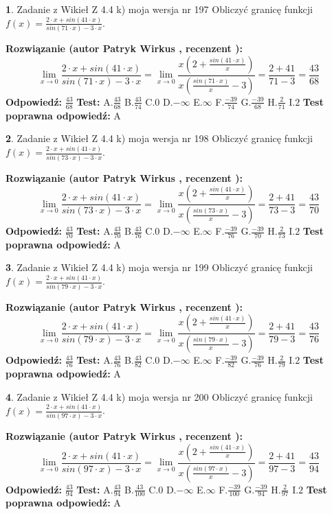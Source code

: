 \documentclass[12pt, a4paper]{article}
\theoremstyle{definition} %
\newtheorem{zad}{}
\newcommand{\zadStart}[1]{\begin{zad}#1\newline}
\newcommand{\zadStop}{\end{zad}}
\newcommand{\rozwStart}[2]{\noindent \textbf{Rozwiązanie (autor #1 , recenzent #2): }\newline}
\newcommand{\rozwStop}{\newline}
\newcommand{\odpStart}{\noindent \textbf{Odpowiedź:}\newline}
\newcommand{\odpStop}{\newline}
\newcommand{\testStart}{\noindent \textbf{Test:}\newline}
\newcommand{\testStop}{\newline}
\newcommand{\kluczStart}{\noindent \textbf{Test poprawna odpowiedź:}\newline}
\newcommand{\kluczStop}{\newline}
\begin{document}
\zadStart{Zadanie z Wikieł Z 4.4 k) moja wersja nr 197}
Obliczyć granicę funkcji $f(x)=\frac{2\cdot x +sin(41\cdot x)}{sin(71\cdot x) -3\cdot x}$.
\zadStop
\rozwStart{Patryk Wirkus}{}
$$\lim\limits_{x\to 0}\frac{2\cdot x +sin(41\cdot x)}{sin(71\cdot x) -3\cdot x}
=\lim\limits_{x\to 0}\frac{x(2+\frac{sin(41\cdot x)}{x})}{x(\frac{sin(71\cdot x)}{x}-3)}
=\frac{2+41}{71-3} = \frac{43}{68}$$
\rozwStop
\odpStart
$\frac{43}{68}$
\odpStop
\testStart
A.$\frac{43}{68}$
B.$\frac{43}{74}$
C.$0$
D.$-\infty$
E.$\infty$
F.$\frac{-39}{74}$
G.$\frac{-39}{68}$
H.$\frac{2}{71}$
I.$2$
\testStop
\kluczStart
A
\kluczStop



\zadStart{Zadanie z Wikieł Z 4.4 k) moja wersja nr 198}
Obliczyć granicę funkcji $f(x)=\frac{2\cdot x +sin(41\cdot x)}{sin(73\cdot x) -3\cdot x}$.
\zadStop
\rozwStart{Patryk Wirkus}{}
$$\lim\limits_{x\to 0}\frac{2\cdot x +sin(41\cdot x)}{sin(73\cdot x) -3\cdot x}
=\lim\limits_{x\to 0}\frac{x(2+\frac{sin(41\cdot x)}{x})}{x(\frac{sin(73\cdot x)}{x}-3)}
=\frac{2+41}{73-3} = \frac{43}{70}$$
\rozwStop
\odpStart
$\frac{43}{70}$
\odpStop
\testStart
A.$\frac{43}{70}$
B.$\frac{43}{76}$
C.$0$
D.$-\infty$
E.$\infty$
F.$\frac{-39}{76}$
G.$\frac{-39}{70}$
H.$\frac{2}{73}$
I.$2$
\testStop
\kluczStart
A
\kluczStop



\zadStart{Zadanie z Wikieł Z 4.4 k) moja wersja nr 199}
Obliczyć granicę funkcji $f(x)=\frac{2\cdot x +sin(41\cdot x)}{sin(79\cdot x) -3\cdot x}$.
\zadStop
\rozwStart{Patryk Wirkus}{}
$$\lim\limits_{x\to 0}\frac{2\cdot x +sin(41\cdot x)}{sin(79\cdot x) -3\cdot x}
=\lim\limits_{x\to 0}\frac{x(2+\frac{sin(41\cdot x)}{x})}{x(\frac{sin(79\cdot x)}{x}-3)}
=\frac{2+41}{79-3} = \frac{43}{76}$$
\rozwStop
\odpStart
$\frac{43}{76}$
\odpStop
\testStart
A.$\frac{43}{76}$
B.$\frac{43}{82}$
C.$0$
D.$-\infty$
E.$\infty$
F.$\frac{-39}{82}$
G.$\frac{-39}{76}$
H.$\frac{2}{79}$
I.$2$
\testStop
\kluczStart
A
\kluczStop



\zadStart{Zadanie z Wikieł Z 4.4 k) moja wersja nr 200}
Obliczyć granicę funkcji $f(x)=\frac{2\cdot x +sin(41\cdot x)}{sin(97\cdot x) -3\cdot x}$.
\zadStop
\rozwStart{Patryk Wirkus}{}
$$\lim\limits_{x\to 0}\frac{2\cdot x +sin(41\cdot x)}{sin(97\cdot x) -3\cdot x}
=\lim\limits_{x\to 0}\frac{x(2+\frac{sin(41\cdot x)}{x})}{x(\frac{sin(97\cdot x)}{x}-3)}
=\frac{2+41}{97-3} = \frac{43}{94}$$
\rozwStop
\odpStart
$\frac{43}{94}$
\odpStop
\testStart
A.$\frac{43}{94}$
B.$\frac{43}{100}$
C.$0$
D.$-\infty$
E.$\infty$
F.$\frac{-39}{100}$
G.$\frac{-39}{94}$
H.$\frac{2}{97}$
I.$2$
\testStop
\kluczStart
A
\kluczStop
\end{document}

